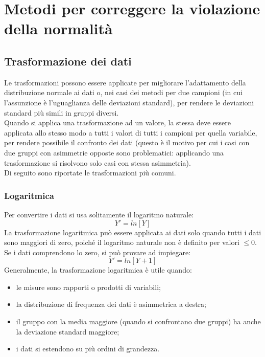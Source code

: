 \documentclass[10pt, draft]{book}
\newcommand{\tightlist}{%
\setlength{\itemsep}{1pt}\setlength{\parskip}{0pt}\setlength{\parsep}{0pt}}
\begin{document}
\section{Metodi per correggere la violazione della normalità}

\subsection{Trasformazione dei dati}

Le trasformazioni possono essere applicate per migliorare l'adattamento  della distribuzione normale ai dati o, nei casi dei metodi per due campioni (in cui l'assunzione è l'uguaglianza delle deviazioni standard), per rendere le deviazioni standard più simili in gruppi diversi.\\
Quando si applica una trasformazione ad un valore, la stessa deve essere applicata allo stesso modo a tutti i valori di tutti i campioni per quella variabile, per rendere possibile il confronto dei dati (questo è il motivo per cui i casi con due gruppi con asimmetrie opposte sono problematici: applicando una trasformazione si risolvono solo casi con stessa asimmetria).\\
Di seguito sono riportate le trasformazioni più comuni.

\subsubsection{Logaritmica}

Per convertire i dati si usa solitamente il logaritmo naturale:
\begin{equation}
    Y'= ln[Y]
\end{equation}
La trasformazione logaritmica può essere applicata ai dati solo quando tutti i dati sono maggiori di zero, poiché il logaritmo naturale non è definito per valori $\leq 0$. Se i dati comprendono lo zero, si può provare ad impiegare:
\begin{equation}
    Y'= ln[Y+1]
\end{equation}
Generalmente, la trasformazione logaritmica è utile quando:
\begin{itemize} \tightlist
    \item le misure sono rapporti o prodotti di variabili;
    \item la distribuzione di frequenza dei dati è asimmetrica a destra;
    \item il gruppo con la media maggiore (quando si confrontano due gruppi) ha anche la deviazione standard maggiore;
    \item i dati si estendono su più ordini di grandezza.
\end{itemize}
\end{document}

